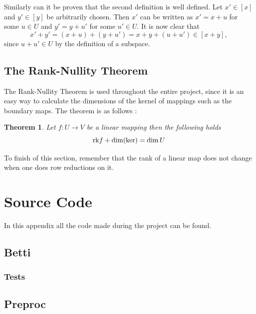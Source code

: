 \documentclass[11pt,a4paper,twoside, openright]{report}
\newtheorem{mythm}{Theorem}[chapter]
\begin{document}
Similarly can it be proven that the second definition is well defined. Let $x'\in[x]$ and $y'\in [y]$ be arbitrarily chosen. Then $x'$ can be written as $x'=x+u$ for some $u\in U$ and $y' = y+u'$ for some $u'\in U$. It is now clear that
\begin{equation*}
x'+y'=(x+u)+(y+u')=x+y+(u+u')\in [x+y],
\end{equation*}
since $u+u'\in U$ by the definition of a subspace.


\section{The Rank-Nullity Theorem}
The Rank-Nullity Theorem is used throughout the entire project, since it is an easy way to calculate the dimensions of the kernel of mappings such as the boundary maps. The theorem is as follows \cite[p. 109]{LinAlg}: 
\begin{mythm}\label{thm:rank_nullity}
Let $f:U\to V$ be a linear mapping then the following holds
\begin{equation*}
\textnormal{rk}f+\dim(\ker)=\dim U
\end{equation*}
\end{mythm}

To finish of this section, remember that the rank of a linear map does not change when one does row reductions on it.

\chapter{Source Code}\label{ch:source_code}
In this appendix all the code made during the project can be found.
\section{Betti}


\newpage





\newpage

\subsection{Tests}




\newpage
\section{Preproc}

\newpage\null
\end{document}
